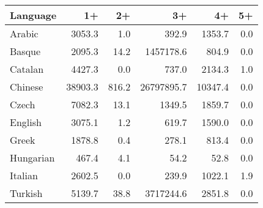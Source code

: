 \begin{tabular}{lrrrrr}
\toprule
 Language   &      1+ &    2+ &         3+ &      4+ &   5+ \\
\midrule
 Arabic     &  3053.3 &   1.0 &      392.9 &  1353.7 &  0.0 \\
 Basque     &  2095.3 &  14.2 &  1457178.6 &   804.9 &  0.0 \\
 Catalan    &  4427.3 &   0.0 &      737.0 &  2134.3 &  1.0 \\
 Chinese    & 38903.3 & 816.2 & 26797895.7 & 10347.4 &  0.0 \\
 Czech      &  7082.3 &  13.1 &     1349.5 &  1859.7 &  0.0 \\
 English    &  3075.1 &   1.2 &      619.7 &  1590.0 &  0.0 \\
 Greek      &  1878.8 &   0.4 &      278.1 &   813.4 &  0.0 \\
 Hungarian  &   467.4 &   4.1 &       54.2 &    52.8 &  0.0 \\
 Italian    &  2602.5 &   0.0 &      239.9 &  1022.1 &  1.9 \\
 Turkish    &  5139.7 &  38.8 &  3717244.6 &  2851.8 &  0.0 \\
\bottomrule
\end{tabular}